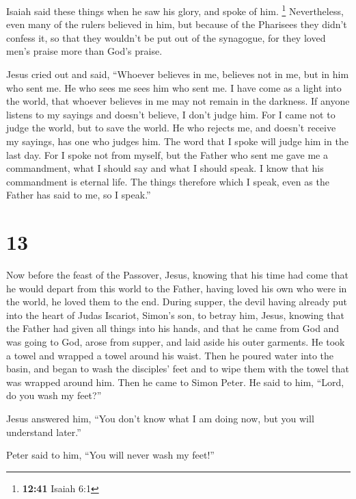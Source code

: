  Isaiah said these things when he saw his glory, and
spoke of him. \footnote{\textbf{12:41} Isaiah 6:1} 
Nevertheless, even many of the rulers believed in him, but because of
the Pharisees they didn't confess it, so that they wouldn't be put out
of the synagogue,  for they loved men's praise more than
God's praise.

 Jesus cried out and said, ``Whoever believes in me,
believes not in me, but in him who sent me.  He who sees
me sees him who sent me.  I have come as a light into the
world, that whoever believes in me may not remain in the darkness.
 If anyone listens to my sayings and doesn't believe, I
don't judge him. For I came not to judge the world, but to save the
world.  He who rejects me, and doesn't receive my
sayings, has one who judges him. The word that I spoke will judge him in
the last day.  For I spoke not from myself, but the
Father who sent me gave me a commandment, what I should say and what I
should speak.  I know that his commandment is eternal
life. The things therefore which I speak, even as the Father has said to
me, so I speak.''

\hypertarget{section-12}{%
\section{13}\label{section-12}}

 Now before the feast of the Passover, Jesus, knowing that
his time had come that he would depart from this world to the Father,
having loved his own who were in the world, he loved them to the end.
 During supper, the devil having already put into the
heart of Judas Iscariot, Simon's son, to betray him, 
Jesus, knowing that the Father had given all things into his hands, and
that he came from God and was going to God,  arose from
supper, and laid aside his outer garments. He took a towel and wrapped a
towel around his waist.  Then he poured water into the
basin, and began to wash the disciples' feet and to wipe them with the
towel that was wrapped around him.  Then he came to Simon
Peter. He said to him, ``Lord, do you wash my feet?''

 Jesus answered him, ``You don't know what I am doing now,
but you will understand later.''

 Peter said to him, ``You will never wash my feet!''

